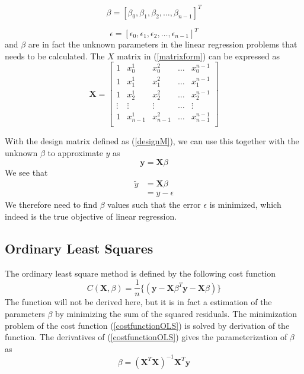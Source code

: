 \documentclass{article}
\begin{document}
\begin{equation}
\beta = [\beta_{0}, \beta_{1}, \beta_{2}, \dots, \beta_{n-1}]^{T}
\end{equation}

\begin{equation}
\epsilon = [\epsilon_{0}, \epsilon_{1}, \epsilon_{2}, \dots, \epsilon_{n-1}]^{T}
\end{equation}
and $\beta$ are in fact the unknown parameters in the linear regression problems that needs to be calculated. The $X$ matrix in (\ref{matrixform}) can be expressed as
\begin{equation} \label{designM}
\textbf{X} = 
\begin{bmatrix}
1 & x_{0}^{1} & x_{0}^{2} & \dots & x_{0}^{n-1} \\
1 & x_{1}^{1} & x_{1}^{2} & \dots & x_{1}^{n-1} \\
1 & x_{2}^{1} & x_{2}^{2} & \dots & x_{2}^{n-1} \\
\vdots & \vdots & \vdots & \dots & \vdots \\
1 & x_{n-1}^{1} & x_{n-1}^{2} & \dots & x_{n-1}^{n-1} \\ 
\end{bmatrix}
\end{equation}

With the design matrix defined as (\ref{designM}), we can use this together with the unknown $\beta$ to approximate $y$ as
\begin{equation}
\textbf{\~{y}} = \textbf{X}\beta
\end{equation}
We see that
\begin{align}
\tilde{y} &= \textbf{X}\beta \\
&= y - \epsilon
\end{align}
We therefore need to find $\beta$ values such that the error $\epsilon$ is minimized, which indeed is the true objective of linear regression.

\subsection{Ordinary Least Squares}
The ordinary least square method is defined by the following cost function
\begin{equation}\label{costfunctionOLS}
C(\textbf{X},\beta) = \dfrac{1}{n} \{( \textbf{y}-\textbf{X}\beta^{T}\textbf{y}-\textbf{X}\beta)\}
\end{equation}
The function will not be derived here, but it is in fact a estimation of the parameters $\beta$ by minimizing the sum of the squared residuals. The minimization problem of the cost function (\ref{costfunctionOLS}) is solved by derivation of the function. The derivatives of (\ref{costfunctionOLS}) gives the parameterization of $\beta$ as
\begin{equation}
\beta = (\textbf{X}^{T}\textbf{X})^{-1}\textbf{X}^{T}\textbf{y}
\end{equation} 
\end{document}

